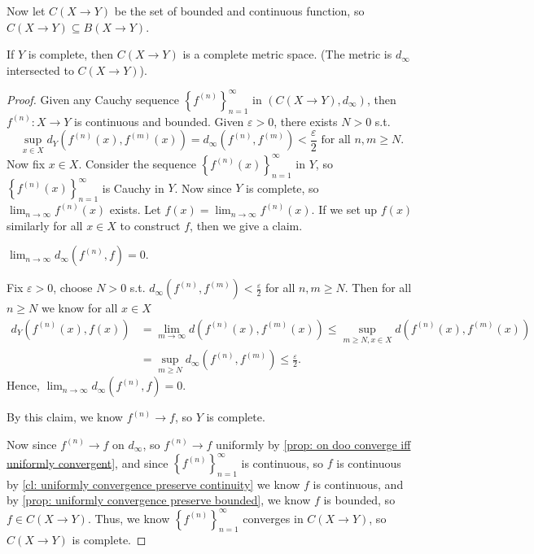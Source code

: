 Now let \(C(X \to Y)\) be the set of bounded and continuous function, so \(C(X \to Y) \subseteq B(X \to Y)\). 
\begin{theorem} \label{thm: if Y complete then C(X to Y) complete}
    If \(Y\) is complete, then \(C(X \to Y)\) is a complete metric space. (The metric is \(d_\infty \) intersected to \(C(X \to Y)\)).
\end{theorem}  
\begin{proof}
    Given any Cauchy sequence \(\left\{ f^{(n)} \right\}_{n=1}^{\infty}  \) in \(\left( C(X \to Y), d_\infty  \right) \), then \(f^{(n)}:X \to Y\) is continuous and bounded. Given \(\varepsilon > 0\), there exists \(N > 0\) s.t.  
    \[
        \sup _{x \in X} d_Y \left( f^{(n)}(x), f^{(m)}(x) \right)  = d_\infty \left( f^{(n)}, f^{(m)} \right) < \frac{\varepsilon}{2} \text{ for all } n, m \ge N.  
    \] Now fix \(x \in X\). Consider the sequence \(\left\{ f^{(n)}(x) \right\}_{n=1}^{\infty}  \) in \(Y\), so \(\left\{ f^{(n)}(x) \right\}_{n=1}^{\infty}  \) is Cauchy in \(Y\). Now since \(Y\) is complete, so \(\lim_{n \to \infty} f^{(n)}(x) \) exists. Let \(f(x) = \lim_{n \to \infty} f^{(n)}(x) \). If we set up \(f(x)\) similarly for all \(x \in X\) to construct \(f\), then we give a claim. 
    \begin{claim}
        \(\lim_{n \to \infty} d_\infty \left( f^{(n)}, f \right) = 0  \). 
    \end{claim}
    \begin{explanation}
        Fix \(\varepsilon > 0\), choose \(N > 0\) s.t. \(d_\infty \left( f^{(n)}, f^{(m)} \right) < \frac{\varepsilon}{2} \) for all \(n, m \ge N\). Then for all \(n \ge N\) we know for all \(x \in X\)  
        \begin{align*}
            d_Y \left( f^{(n)}(x), f(x) \right) &= \lim_{m \to \infty} d \left( f^{(n)}(x), f^{(m)}(x) \right) \le \sup _{m \ge N, x \in X} d \left( f^{(n)}(x), f^{(m)}(x) \right) \\
            &= \sup _{m \ge N} d_\infty \left( f^{(n)}, f^{(m)} \right) \le \frac{\varepsilon}{2}.     
        \end{align*}   
        Hence, \(\lim_{n \to \infty} d_\infty \left( f^{(n)}, f \right) = 0\).  
    \end{explanation}          
    By this claim, we know \(f^{(n)} \to f\), so \(Y\) is complete. 
    
    Now since \(f^{(n)} \to f\) on \(d_{\infty } \), so \(f^{(n)} \to f\) uniformly by \autoref{prop: on doo converge iff uniformly convergent}, and since \(\left\{ f^{(n)} \right\}_{n=1}^{\infty}  \) is continuous, so \(f\) is continuous by \autoref{cl: uniformly convergence preserve continuity} we know \(f\) is continuous, and by \autoref{prop: uniformly convergence preserve bounded}, we know \(f\) is bounded, so \(f \in C(X \to Y)\). Thus, we know \(\left\{ f^{(n)} \right\}_{n=1}^{\infty}  \) converges in \(C(X \to Y)\), so \(C(X \to Y)\) is complete.             
\end{proof}